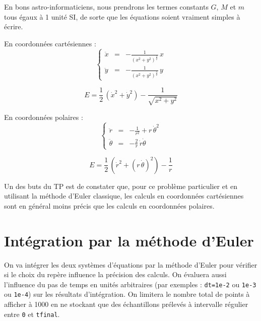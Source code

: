 En bons astro-informaticiens, nous prendrons les termes constants $G$, $M$ et $m$ tous égaux à 1 unité SI, de sorte que les équations soient vraiment simples à écrire.

\vspace{1cm}

\begin{boxedminipage}{\textwidth}

\begin{multicols}{2}
En coordonnées cartésiennes :
\begin{displaymath}
\left\{ \begin{array}{lll}
\ddot{x} & = & \displaystyle - \frac{1}{\left(x^2+y^2\right)^{\frac{3}{2}}}\,x  \\
\ddot{y} & = & \displaystyle - \frac{1}{\left(x^2+y^2\right)^{\frac{3}{2}}}\,y 
\end{array} \right.
\end{displaymath}

$$E = \frac{1}{2}\,(\dot{x}^2+\dot{y}^2)- \frac{1}{\sqrt{x^2+y^2}}$$

    \columnbreak

En coordonnées polaires :
\begin{displaymath}
\left\{ \begin{array}{lll}
\ddot{r} & = & \displaystyle - \frac{1}{r^2} + r\,\dot{\theta}^2 \\
\ddot{\theta} & = & -\frac{2}{r}\,\dot{r}\dot{\theta} 
\end{array} \right.
\end{displaymath}

$$E = \frac{1}{2}\,(\dot{r}^2+(r\,\dot{\theta})^2)- \frac{1}{r}$$

\end{multicols}
\vspace{0.25cm}
\end{boxedminipage}

\vspace{1cm}

Un des buts du TP est de constater que, pour ce problème particulier et en utilisant la méthode d'Euler classique, les calculs en coordonnées cartésiennes sont en général moins précis que les calculs en coordonnées polaires.

\section{Intégration par la méthode d'Euler}

On va intégrer les deux systèmes d’équations par la méthode d’Euler pour vérifier si le choix du repère influence la précision des calculs. On évaluera aussi l’influence du pas de temps en unités arbitraires (par exemples : \verb|dt=1e-2| ou \verb|1e-3| ou \verb|1e-4|) sur les résultats d’intégration. On limitera le nombre total de points à afficher à 1000 en ne stockant que des échantillons prélevés à intervalle régulier entre \verb|0| et \verb|tfinal|. 

